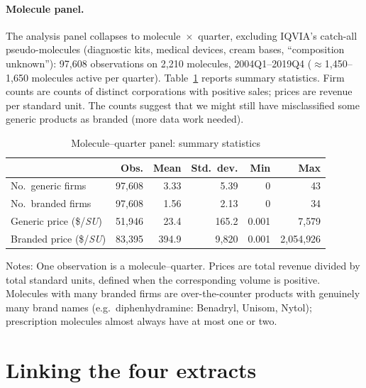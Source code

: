 \documentclass[11pt]{article}
\newcommand{\su}{\textit{SU}}
\begin{document}
\paragraph{Molecule panel.} The analysis panel collapses to
molecule~$\times$~quarter, excluding IQVIA's catch-all pseudo-molecules
(diagnostic kits, medical devices, cream bases, ``composition unknown''):
97{,}608 observations on 2{,}210 molecules, 2004Q1--2019Q4
($\approx$1{,}450--1{,}650 molecules active per quarter).
Table~\ref{tab:sumstats} reports summary statistics. Firm counts are counts
of distinct corporations with positive sales; prices are revenue per
standard unit. The counts suggest that we might still have misclassified some generic products as branded (more data work needed). 

\begin{table}[htbp]
\centering
\caption{Molecule--quarter panel: summary statistics}
\label{tab:sumstats}
\begin{tabular}{lrrrrr}
\toprule
 & Obs. & Mean & Std.\ dev. & Min & Max \\
\midrule
No.\ generic firms        & 97{,}608 & 3.33 & 5.39 & 0 & 43 \\
No.\ branded firms        & 97{,}608 & 1.56 & 2.13 & 0 & 34 \\
Generic price (\$/\su)    & 51{,}946 & 23.4 & 165.2 & 0.001 & 7{,}579 \\
Branded price (\$/\su)    & 83{,}395 & 394.9 & 9{,}820 & 0.001 & 2{,}054{,}926 \\
\bottomrule
\end{tabular}
\par\smallskip
\parbox{0.92\textwidth}{\footnotesize Notes: One observation is a
molecule--quarter. Prices are total revenue divided by total standard
units, defined when the corresponding volume is positive. Molecules with
many branded firms are over-the-counter products with genuinely many brand
names (e.g.\ diphenhydramine: Benadryl, Unisom, Nytol); prescription
molecules almost always have at most one or two.}
\end{table}

\section{Linking the four extracts}
\end{document}
